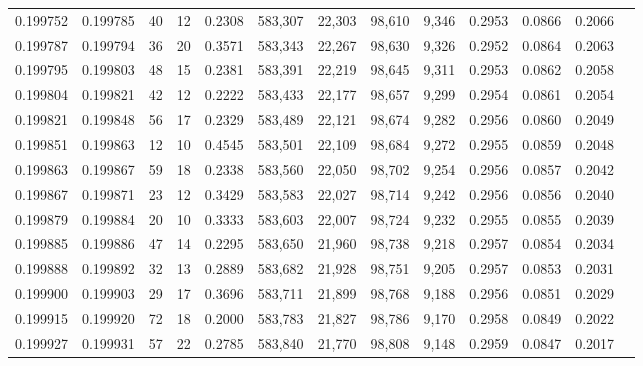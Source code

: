 \begin{tabular}{rrrrrrrrrrrrr}
0.199752 & 0.199785 &    40 &  12 &                                     0.2308 & 583,307 &  22,303 &  98,610 &   9,346 & 0.2953 & 0.0866 & 0.2066 \\
0.199787 & 0.199794 &    36 &  20 &                                     0.3571 & 583,343 &  22,267 &  98,630 &   9,326 & 0.2952 & 0.0864 & 0.2063 \\
0.199795 & 0.199803 &    48 &  15 &                                     0.2381 & 583,391 &  22,219 &  98,645 &   9,311 & 0.2953 & 0.0862 & 0.2058 \\
0.199804 & 0.199821 &    42 &  12 &                                     0.2222 & 583,433 &  22,177 &  98,657 &   9,299 & 0.2954 & 0.0861 & 0.2054 \\
0.199821 & 0.199848 &    56 &  17 &                                     0.2329 & 583,489 &  22,121 &  98,674 &   9,282 & 0.2956 & 0.0860 & 0.2049 \\
0.199851 & 0.199863 &    12 &  10 &                                     0.4545 & 583,501 &  22,109 &  98,684 &   9,272 & 0.2955 & 0.0859 & 0.2048 \\
0.199863 & 0.199867 &    59 &  18 &                                     0.2338 & 583,560 &  22,050 &  98,702 &   9,254 & 0.2956 & 0.0857 & 0.2042 \\
0.199867 & 0.199871 &    23 &  12 &                                     0.3429 & 583,583 &  22,027 &  98,714 &   9,242 & 0.2956 & 0.0856 & 0.2040 \\
0.199879 & 0.199884 &    20 &  10 &                                     0.3333 & 583,603 &  22,007 &  98,724 &   9,232 & 0.2955 & 0.0855 & 0.2039 \\
0.199885 & 0.199886 &    47 &  14 &                                     0.2295 & 583,650 &  21,960 &  98,738 &   9,218 & 0.2957 & 0.0854 & 0.2034 \\
0.199888 & 0.199892 &    32 &  13 &                                     0.2889 & 583,682 &  21,928 &  98,751 &   9,205 & 0.2957 & 0.0853 & 0.2031 \\
0.199900 & 0.199903 &    29 &  17 &                                     0.3696 & 583,711 &  21,899 &  98,768 &   9,188 & 0.2956 & 0.0851 & 0.2029 \\
0.199915 & 0.199920 &    72 &  18 &                                     0.2000 & 583,783 &  21,827 &  98,786 &   9,170 & 0.2958 & 0.0849 & 0.2022 \\
0.199927 & 0.199931 &    57 &  22 &                                     0.2785 & 583,840 &  21,770 &  98,808 &   9,148 & 0.2959 & 0.0847 & 0.2017 \\

\end{tabular}

